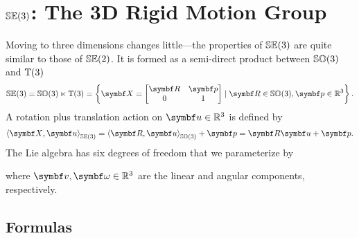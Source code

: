 
\chapter{\texorpdfstring{${\mathbb{SE}(3)}$}{SE(3)}: The 3D Rigid Motion Group}

Moving to three dimensions changes little---the properties of ${\mathbb{SE}(3)}$ are quite similar to those of ${\mathbb{SE}(2)}$. It is formed as a semi-direct product between ${\mathbb{SO}(3)}$ and $\mathbb{T}(3)$
\begin{equation}
  \SEthree = \SOthree \ltimes \Tthree = \left\{ \X = \begin{bmatrix}
    \bR & \bp \\ 0 & 1
  \end{bmatrix} \mid \bR \in \SOthree, \bp \in \mathbb{R}^3 \right\}.
\end{equation}
A rotation plus translation action on $\bu \in \mathbb{R}^3$ is defined by
\begin{equation}
  \left \langle \X, \bu \right \rangle_\SEthree = \left \langle \bR, \bu \right \rangle_\SOthree + \bp = \bR \bu + \bp.
\end{equation}
The Lie algebra has six degrees of freedom that we parameterize by
\begin{center}
\end{center}
where $\bv, \bomega \in \mathbb{R}^3$ are the linear and angular components, respectively.

\section{Formulas}

